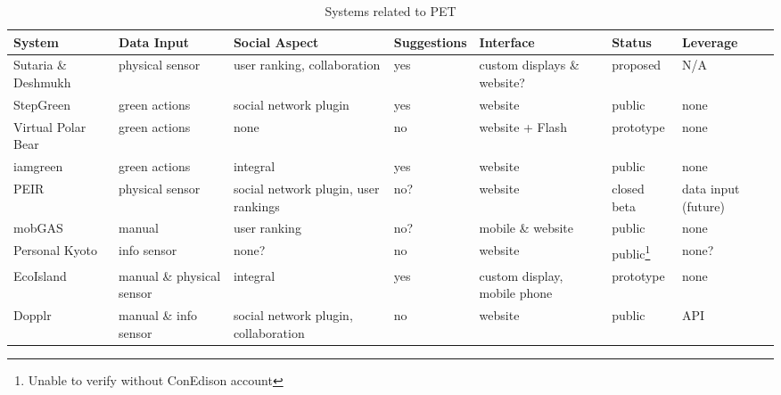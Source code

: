 \begin{table}[htbp]
	\begin{center}
		\begin{minipage}{\textwidth}
		\scriptsize
		\begin{tabular}{| l || p{2cm} | p{2cm} | l | p{2.25cm} | l | p{1.5cm} |}
			\hline
			System & Data Input & Social Aspect & Suggestions & Interface & Status & Leverage \\ \hline \hline
			
			Sutaria \& Deshmukh & physical sensor & user ranking, collaboration & yes & custom displays \& website? & proposed & N/A \\ \hline
			
			StepGreen & green actions & social network plugin & yes & website & public & none \\ \hline
			
			Virtual Polar Bear & green actions & none & no & website + Flash & prototype & none \\ \hline
	
			iamgreen & green actions & integral & yes & website & public & none \\ \hline

			PEIR & physical sensor & social network plugin, user rankings & no? & website & closed beta & data input (future) \\ \hline

			mobGAS & manual & user ranking & no? & mobile \& website & public & none \\ \hline

			Personal Kyoto & info sensor & none? & no & website & public\footnote{Unable to verify without ConEdison account} & none? \\ \hline

			EcoIsland & manual \& physical sensor & integral & yes & custom display, mobile phone & prototype & none \\ \hline

			Dopplr & manual \& info sensor & social network plugin, collaboration & no & website & public & API \\ \hline
			
		\end{tabular}
		\end{minipage}
	\caption{Systems related to PET}
	\label{tab:related-work-synthesis}
	\end{center}
\end{table}

